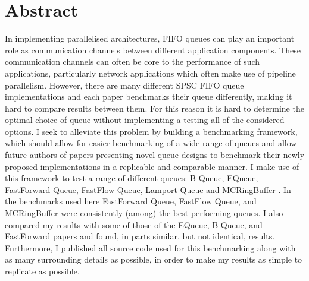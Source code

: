 \section*{Abstract}
In implementing parallelised architectures, FIFO queues can play an important role as communication channels between different application components\cite{WangCheng2009}.
These communication channels can often be core to the performance of such applications, particularly network applications which often make use of pipeline parallelism\cite{Upadhyaya2007,WangCheng2009}.
However, there are many different SPSC FIFO queue implementations and each paper benchmarks their queue differently, making it hard to compare results between them.
For this reason it is hard to determine the optimal choice of queue without implementing a testing all of the considered options.
I seek to alleviate this problem by building a benchmarking framework, which should allow for easier benchmarking of a wide range of queues and allow future authors of papers presenting novel queue designs to benchmark their newly proposed implementations in a replicable and comparable manner.
I make use of this framework to test a range of different queues: B-Queue, EQueue, FastForward Queue, FastFlow Queue, Lamport Queue and MCRingBuffer \cite{B-Queue,EQueue,FastForward,FastFlowGithub,Lamport,MCRingBuffer}.
In the benchmarks used here FastForward Queue, FastFlow Queue, and MCRingBuffer were consistently (among) the best performing queues.
I also compared my results with some of those of the EQueue, B-Queue, and FastForward papers and found, in parts similar, but not identical, results.
Furthermore, I published all source code used for this benchmarking along with as many surrounding details as possible, in order to make my results as simple to replicate as possible.
